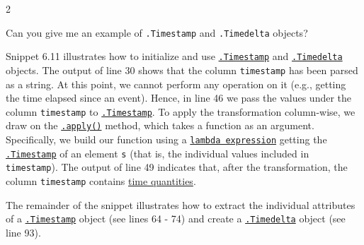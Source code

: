 \documentclass[a4paper,11pt]{book}
\newcommand{\question}[1]{%
    \begin{tcolorbox}[colback=comp_c!10,colframe=comp_c,sidebyside align=top,width=\linewidth,before skip=1ex]
        #1
    \end{tcolorbox}
    \switchcolumn%
}
\newcommand{\note}[1]{%
    \begin{tcolorbox}[colback=white!0,colframe=white!10,width=\linewidth,before skip=1ex]
        #1
    \end{tcolorbox}
}
\begin{document}
\begin{paracol}{2}
	\question{\raggedright Can you give me an example of \texttt{.Timestamp} and \texttt{.Timedelta} objects?}
	\note{Snippet 6.11 illustrates how to initialize and use \href{https://pandas.pydata.org/docs/reference/api/pandas.Timestamp.html}{\texttt{.Timestamp}} and \href{https://pandas.pydata.org/docs/reference/api/pandas.Timedelta.html}{\texttt{.Timedelta}} objects. The output of line 30 shows that the column \texttt{timestamp} has been parsed as a string. At this point, we cannot perform any operation on it (e.g., getting the time elapsed since an event). Hence, in line 46 we pass the values under the column \texttt{timestamp} to \href{https://pandas.pydata.org/docs/reference/api/pandas.Timestamp.html}{\texttt{.Timestamp}}. To apply the transformation column-wise, we draw on the \href{https://pandas.pydata.org/docs/reference/api/pandas.DataFrame.apply.html}{\texttt{.apply()}} method, which takes a function as an argument. Specifically, we build our function using a \href{https://docs.python.org/3/tutorial/controlflow.html}{\texttt{lambda expression}} getting the \href{https://pandas.pydata.org/docs/reference/api/pandas.Timestamp.html}{\texttt{.Timestamp}} of an element \texttt{s} (that is, the individual values included in \texttt{timestamp}). The output of line 49 indicates that, after the transformation, the column \texttt{timestamp} contains \href{https://docs.python.org/3/library/datetime.html}{time quantities}.
	
	\quad The remainder of the snippet illustrates how to extract the individual attributes of a \href{https://pandas.pydata.org/docs/reference/api/pandas.Timestamp.html}{\texttt{.Timestamp}} object (see lines 64 - 74) and create a \href{https://pandas.pydata.org/docs/reference/api/pandas.Timedelta.html}{\texttt{.Timedelta}} object (see line 93).
	}
\end{paracol}
\end{document}
